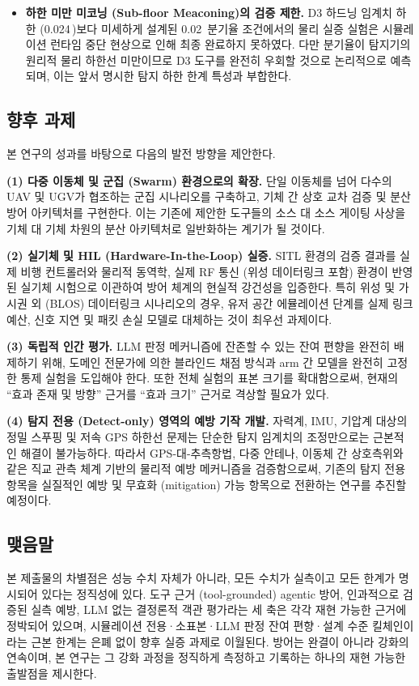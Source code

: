 \begin{itemize}[leftmargin=*]
    \item \textbf{하한 미만 미코닝 (Sub-floor Meaconing)의 검증 제한.} D3 하드닝 임계치 하한 (0.024\,)보다 미세하게 설계된 0.02\, 분기율 조건에서의 물리 실증 실험은 시뮬레이션 런타임 중단 현상으로 인해 최종 완료하지 못하였다. 다만 분기율이 탐지기의 원리적 물리 하한선 미만이므로 D3 도구를 완전히 우회할 것으로 논리적으로 예측되며, 이는 앞서 명시한 탐지 하한 한계 특성과 부합한다.
\end{itemize}

\subsection{향후 과제}

본 연구의 성과를 바탕으로 다음의 발전 방향을 제안한다.

\textbf{(1) 다중 이동체 및 군집 (Swarm) 환경으로의 확장.} 단일 이동체를 넘어 다수의 UAV 및 UGV가 협조하는 군집 시나리오를 구축하고, 기체 간 상호 교차 검증 및 분산 방어 아키텍처를 구현한다. 이는 기존에 제안한 도구들의 소스 대 소스 게이팅 사상을 기체 대 기체 차원의 분산 아키텍처로 일반화하는 계기가 될 것이다.

\textbf{(2) 실기체 및 HIL (Hardware-In-the-Loop) 실증.} SITL 환경의 검증 결과를 실제 비행 컨트롤러와 물리적 동역학, 실제 RF 통신 (위성 데이터링크 포함) 환경이 반영된 실기체 시험으로 이관하여 방어 체계의 현실적 강건성을 입증한다. 특히 위성 및 가시권 외 (BLOS) 데이터링크 시나리오의 경우, 유저 공간 에뮬레이션 단계를 실제 링크 예산, 신호 지연 및 패킷 손실 모델로 대체하는 것이 최우선 과제이다.

\textbf{(3) 독립적 인간 평가.} LLM 판정 메커니즘에 잔존할 수 있는 잔여 편향을 완전히 배제하기 위해, 도메인 전문가에 의한 블라인드 채점 방식과 arm 간 모델을 완전히 고정한 통제 실험을 도입해야 한다. 또한 전체 실험의 표본 크기를 확대함으로써, 현재의 ``효과 존재 및 방향'' 근거를 ``효과 크기'' 근거로 격상할 필요가 있다.

\textbf{(4) 탐지 전용 (Detect-only) 영역의 예방 기작 개발.} 자력계, IMU, 기압계 대상의 정밀 스푸핑 및 저속 GPS 하한선 문제는 단순한 탐지 임계치의 조정만으로는 근본적인 해결이 불가능하다. 따라서 GPS-대-추측항법, 다중 안테나, 이동체 간 상호측위와 같은 직교 관측 체계 기반의 물리적 예방 메커니즘을 검증함으로써, 기존의 탐지 전용 항목을 실질적인 예방 및 무효화 (mitigation) 가능 항목으로 전환하는 연구를 추진할 예정이다.

\subsection{맺음말}

본 제출물의 차별점은 성능 수치 자체가 아니라, 모든 수치가 실측이고 모든 한계가 명시되어 있다는 정직성에 있다. 도구 근거 (tool-grounded) agentic 방어, 인과적으로 검증된 실측 예방, LLM 없는 결정론적 객관 평가라는 세 축은 각각 재현 가능한 근거에 정박되어 있으며, 시뮬레이션 전용·소표본·LLM 판정 잔여 편향·설계 수준 킬체인이라는 근본 한계는 은폐 없이 향후 실증 과제로 이월된다. 방어는 완결이 아니라 강화의 연속이며, 본 연구는 그 강화 과정을 정직하게 측정하고 기록하는 하나의 재현 가능한 출발점을 제시한다.
